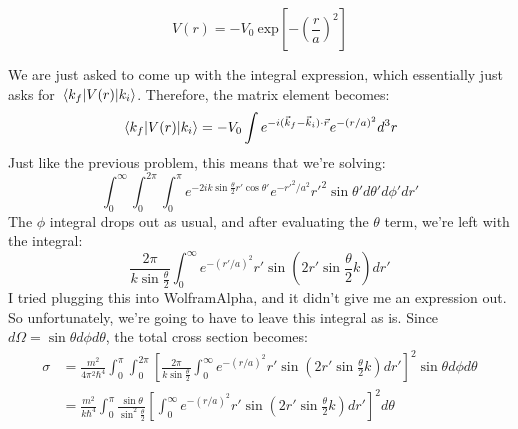 \documentclass[10pt]{article}
\begin{document}
	\[ 
		V(r) = -V_0 \ \mathrm{exp}\left[-\left( \frac{r}{a} \right)^2\right]
	\] 
	
	\begin{solution}
		We are just asked to come up with the integral expression, which essentially just asks for $\mel{k_f}
		{V(r)}{k_i}$. Therefore, the matrix element becomes: 
		\[
			\mel{k_f}{V(r)}{k_i} =  -V_0\int e^{-i(\vec k_f - \vec k_i) \cdot \vec r} e^{-(r/a)^2} d^3r\\
		\] 
		Just like the previous problem, this means that we're solving: 
		\[
			\int_0^\infty \int_0^{2\pi} \int_0^\pi e^{-2ik \sin \frac{\theta}{2}r' \cos \theta'} e^{-r'^2/a^2}
			r'^2 \sin \theta' d\theta' d\phi' dr'
		\] 
		The $\phi$ integral drops out as usual, and after evaluating the $\theta$ term, we're left with the 
		integral: 
		\[
			\frac{2\pi}{k \sin \frac{\theta}{2}}\int_0^\infty e^{-(r'/a)^2} r' \sin (2r'\sin \frac{\theta}{2}k)
			dr'
		\] 
		I tried plugging this into WolframAlpha, and it didn't give me an expression out. So unfortunately, 
		we're going to have to leave this integral as is. Since $d\Omega = \sin \theta d\phi d\theta$, the total
		cross section becomes: 
		\begin{align*}
			\sigma &= \frac{m^2}{4\pi^2 \hbar^4} \int_0^\pi \int_0^{2\pi} \left[\frac{2\pi}{k \sin \frac{\theta}{2}} \int_0^\infty e^{-(r/a)^2} r' \sin(2r' \sin \frac{\theta}{2} k) dr'\right]^2  \sin \theta d\phi d\theta \\
				   &= \frac{m^2}{k\hbar^4} \int_0^\pi \frac{\sin \theta}{\sin^2 \frac{\theta}{2}}\left[ \int_0^\infty  
				   e^{-(r/a)^2} r' \sin(2r' \sin \frac{\theta}{2} k) dr'\right]^2 d\theta  
		\end{align*}
	\end{solution}
\end{document}
